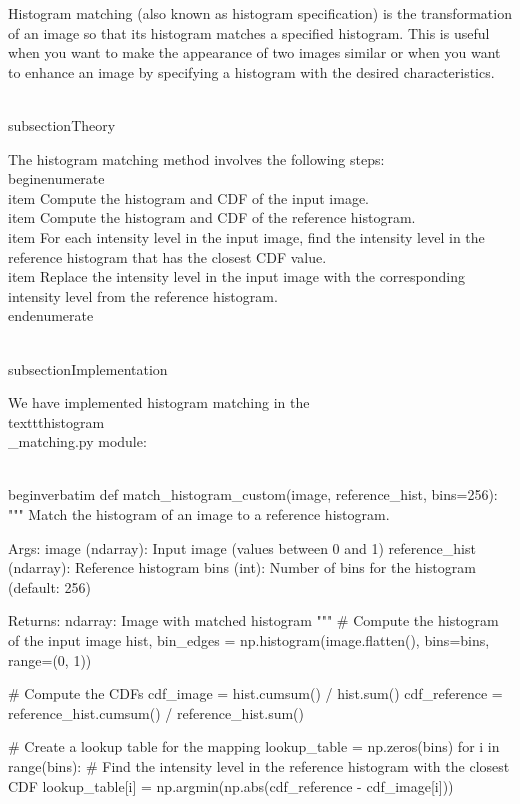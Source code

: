 Histogram matching (also known as histogram specification) is the transformation of an image so that its histogram matches a specified histogram. This is useful when you want to make the appearance of two images similar or when you want to enhance an image by specifying a histogram with the desired characteristics.

\\subsection{Theory}

The histogram matching method involves the following steps:
\\begin{enumerate}
\\item Compute the histogram and CDF of the input image.
\\item Compute the histogram and CDF of the reference histogram.
\\item For each intensity level in the input image, find the intensity level in the reference histogram that has the closest CDF value.
\\item Replace the intensity level in the input image with the corresponding intensity level from the reference histogram.
\\end{enumerate}

\\subsection{Implementation}

We have implemented histogram matching in the \\texttt{histogram\\_matching.py} module:

\\begin{verbatim}
def match_histogram_custom(image, reference_hist, bins=256):
    """
    Match the histogram of an image to a reference histogram.
    
    Args:
        image (ndarray): Input image (values between 0 and 1)
        reference_hist (ndarray): Reference histogram
        bins (int): Number of bins for the histogram (default: 256)
        
    Returns:
        ndarray: Image with matched histogram
    """
    # Compute the histogram of the input image
    hist, bin_edges = np.histogram(image.flatten(), bins=bins, range=(0, 1))
    
    # Compute the CDFs
    cdf_image = hist.cumsum() / hist.sum()
    cdf_reference = reference_hist.cumsum() / reference_hist.sum()
    
    # Create a lookup table for the mapping
    lookup_table = np.zeros(bins)
    for i in range(bins):
        # Find the intensity level in the reference histogram with the closest CDF
        lookup_table[i] = np.argmin(np.abs(cdf_reference - cdf_image[i]))
    
